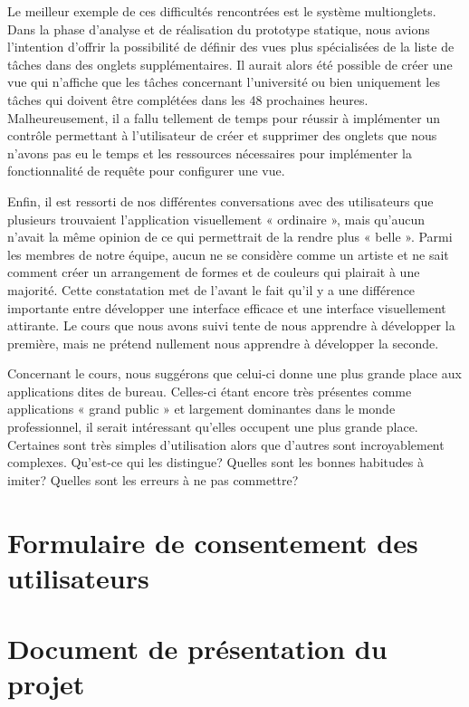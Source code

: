 \documentclass[letterpaper, oneside, 12pt, these, creativecommons]{thETS}
\begin{document}
Le meilleur exemple de ces difficultés rencontrées est le système multionglets. Dans la phase d'analyse et de réalisation du prototype statique, nous avions l'intention d'offrir la possibilité de définir des vues plus spécialisées de la liste de tâches dans des onglets supplémentaires. Il aurait alors été possible de créer une vue qui n'affiche que les tâches concernant l'université ou bien uniquement les tâches qui doivent être complétées dans les 48 prochaines heures. Malheureusement, il a fallu tellement de temps pour réussir à implémenter un contrôle permettant à l'utilisateur de créer et supprimer des onglets que nous n'avons pas eu le temps et les ressources nécessaires pour implémenter la fonctionnalité de requête pour configurer une vue.

Enfin, il est ressorti de nos différentes conversations avec des utilisateurs que plusieurs trouvaient l'application visuellement « ordinaire », mais qu'aucun n'avait la même opinion de ce qui permettrait de la rendre plus « belle ». Parmi les membres de notre équipe, aucun ne se considère comme un artiste et ne sait comment créer un arrangement de formes et de couleurs qui plairait à une majorité. Cette constatation met de l'avant le fait qu'il y a une différence importante entre développer une interface efficace et une interface visuellement attirante. Le cours que nous avons suivi tente de nous apprendre à développer la première, mais ne prétend nullement nous apprendre à développer la seconde.

Concernant le cours, nous suggérons que celui-ci donne une plus grande place aux applications dites de bureau. Celles-ci étant encore très présentes comme applications « grand public » et largement dominantes dans le monde professionnel, il serait intéressant qu'elles occupent une plus grande place. Certaines sont très simples d'utilisation alors que d'autres sont incroyablement complexes. Qu'est-ce qui les distingue? Quelles sont les bonnes habitudes à imiter? Quelles sont les erreurs à ne pas commettre?

\appendix
\multiannexe

\chapter{Formulaire de consentement des utilisateurs}



\chapter{Document de présentation du projet}
\end{document}

